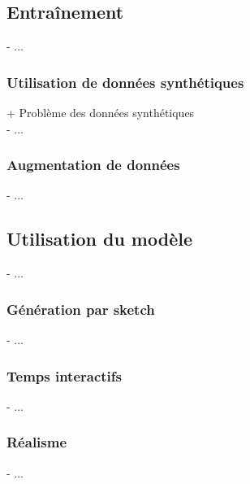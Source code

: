 \subsection{Entraînement}
- ...

\subsubsection{Utilisation de données synthétiques}
+ Problème des données synthétiques \\
- ...

\subsubsection{Augmentation de données}
- ...

\subsection{Utilisation du modèle}
- ...

\subsubsection{Génération par sketch}
- ...

\subsubsection{Temps interactifs}
- ...

\subsubsection{Réalisme}
- ...

